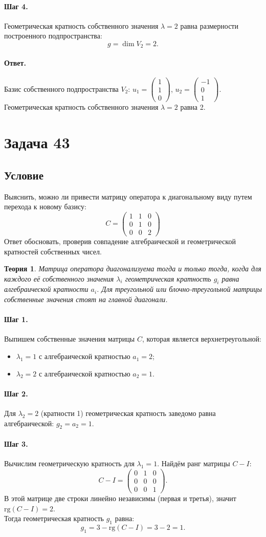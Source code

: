 \documentclass[12pt,a4paper]{article}
\theoremstyle{solution}
\newtheorem*{theory}{Теория}
\newcommand{\task}[1]{\newpage\section*{Задача #1}}
\newcommand{\answer}{\paragraph{Ответ.}}
\newcommand{\step}[1]{\paragraph{Шаг #1.}}
\begin{document}
\step{4} Геометрическая кратность собственного значения $\lambda = 2$ равна размерности построенного подпространства:
\[
g = \dim V_2 = 2.
\]

\answer
Базис собственного подпространства $V_2$: $u_1 = \begin{pmatrix} 1 \\ 1 \\ 0 \end{pmatrix}$, $u_2 = \begin{pmatrix} -1 \\ 0 \\ 1 \end{pmatrix}$. Геометрическая кратность собственного значения $\lambda = 2$ равна 2.

\task{43}
\subsection*{Условие}
Выяснить, можно ли привести матрицу оператора к диагональному виду путем перехода к новому базису:
\[
C = \begin{pmatrix} 1 & 1 & 0 \\ 0 & 1 & 0 \\ 0 & 0 & 2 \end{pmatrix}
\]
Ответ обосновать, проверив совпадение алгебраической и геометрической кратностей собственных чисел.

\begin{theory}
Матрица оператора диагонализуема тогда и только тогда, когда для каждого её собственного значения $\lambda_i$ геометрическая кратность $g_i$ равна алгебраической кратности $a_i$. 
Для треугольной или блочно-треугольной матрицы собственные значения стоят на главной диагонали.
\end{theory}

\step{1} Выпишем собственные значения матрицы $C$, которая является верхнетреугольной:
\begin{itemize}
    \item $\lambda_1 = 1$ с алгебраической кратностью $a_1 = 2$;
    \item $\lambda_2 = 2$ с алгебраической кратностью $a_2 = 1$.
\end{itemize}

\step{2} Для $\lambda_2 = 2$ (кратности 1) геометрическая кратность заведомо равна алгебраической: $g_2 = a_2 = 1$.

\step{3} Вычислим геометрическую кратность для $\lambda_1 = 1$. Найдём ранг матрицы $C - I$:
\[
C - I = \begin{pmatrix} 0 & 1 & 0 \\ 0 & 0 & 0 \\ 0 & 0 & 1 \end{pmatrix}.
\]
В этой матрице две строки линейно независимы (первая и третья), значит $\mathrm{rg}(C - I) = 2$. \\
Тогда геометрическая кратность $g_1$ равна:
\[
g_1 = 3 - \mathrm{rg}(C - I) = 3 - 2 = 1.
\]
\end{document}
